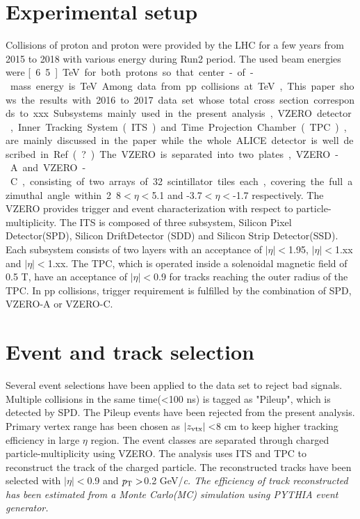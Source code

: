 \documentclass[ALICE,manyauthors]{cernphprep}
\begin{document}

\section{Experimental setup}
Collisions of proton and proton were provided by the LHC for a few years from 2015 to 2018 with various energy during Run2 period. The used beam energies were \unit[6.5]{TeV} for both protons so that center-of-mass energy is \unit[13]{TeV}. Among data from pp collisions at \unit[13]{TeV}, This paper shows the results with 2016 to 2017 data set whose total cross section corresponds to xxx. 
Subsystems mainly used in the present analysis, VZERO detector, Inner Tracking System(ITS) and Time Projection Chamber(TPC), are mainly discussed in the paper while the whole ALICE detector is well described in Ref(?). The VZERO is separated into two plates, VZERO-A and VZERO-C, consisting of two arrays of 32 scintillator tiles each, covering the full azimuthal angle within 2.8$<\eta<$5.1 and -3.7$<\eta<$-1.7 respectively. The VZERO provides trigger and event characterization with respect to particle-multiplicity. The ITS is composed of three subsystem, Silicon Pixel Detector(SPD), Silicon DriftDetector (SDD) and Silicon Strip Detector(SSD). Each subsystem consists of two layers with an acceptance of $|\eta|<$1.95, $|\eta|<$1.xx and $|\eta|<$1.xx. The TPC, which is operated inside a solenoidal magnetic field of 0.5 T, have an acceptance of $|\eta|<$0.9 for tracks reaching the outer radius of the TPC. In pp collisions, trigger requirement is fulfilled by the combination of SPD, VZERO-A or VZERO-C.

\section {Event and track selection}
Several event selections have been applied to the data set to reject bad signals. Multiple collisions in the same time(<100 ns) is tagged as "Pileup", which is detected by SPD. The Pileup events have been rejected from the present analysis. Primary vertex range has been chosen as $|z_{\rm{vtx}}|<$8 cm to keep higher tracking efficiency  in large $\eta$ region. The event classes are separated through charged particle-multiplicity using VZERO. The analysis uses ITS and TPC to reconstruct the track of the charged particle. The reconstructed tracks have been selected with $|\eta|<$0.9 and $\it{p}_{\rm{T}}>$0.2 GeV/\it{c}\rm{}. The efficiency of track reconstructed has been estimated from a Monte Carlo(MC) simulation using PYTHIA event generator.
\end{document}
